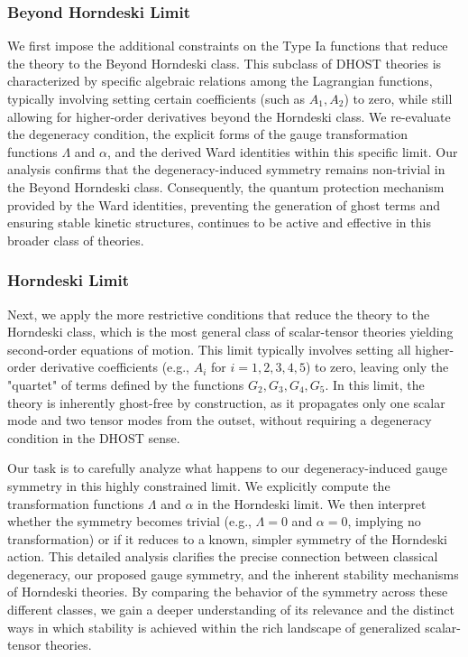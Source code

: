 \documentclass[twocolumn]{aastex631}
\begin{document}
\subsubsection*{Beyond Horndeski Limit}
We first impose the additional constraints on the Type Ia functions that reduce the theory to the Beyond Horndeski class. This subclass of DHOST theories is characterized by specific algebraic relations among the Lagrangian functions, typically involving setting certain coefficients (such as $A_1, A_2$) to zero, while still allowing for higher-order derivatives beyond the Horndeski class. We re-evaluate the degeneracy condition, the explicit forms of the gauge transformation functions $\Lambda$ and $\alpha$, and the derived Ward identities within this specific limit. Our analysis confirms that the degeneracy-induced symmetry remains non-trivial in the Beyond Horndeski class. Consequently, the quantum protection mechanism provided by the Ward identities, preventing the generation of ghost terms and ensuring stable kinetic structures, continues to be active and effective in this broader class of theories.

\subsubsection*{Horndeski Limit}
Next, we apply the more restrictive conditions that reduce the theory to the Horndeski class, which is the most general class of scalar-tensor theories yielding second-order equations of motion. This limit typically involves setting all higher-order derivative coefficients (e.g., $A_i$ for $i=1,2,3,4,5$) to zero, leaving only the "quartet" of terms defined by the functions $G_2, G_3, G_4, G_5$. In this limit, the theory is inherently ghost-free by construction, as it propagates only one scalar mode and two tensor modes from the outset, without requiring a degeneracy condition in the DHOST sense.

Our task is to carefully analyze what happens to our degeneracy-induced gauge symmetry in this highly constrained limit. We explicitly compute the transformation functions $\Lambda$ and $\alpha$ in the Horndeski limit. We then interpret whether the symmetry becomes trivial (e.g., $\Lambda=0$ and $\alpha=0$, implying no transformation) or if it reduces to a known, simpler symmetry of the Horndeski action. This detailed analysis clarifies the precise connection between classical degeneracy, our proposed gauge symmetry, and the inherent stability mechanisms of Horndeski theories. By comparing the behavior of the symmetry across these different classes, we gain a deeper understanding of its relevance and the distinct ways in which stability is achieved within the rich landscape of generalized scalar-tensor theories.
\end{document}
